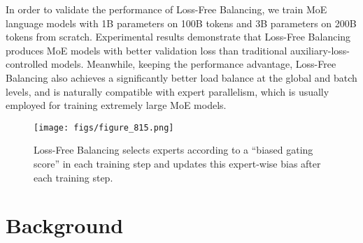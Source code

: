 \documentclass{article} %
\newcommand{\ours}{Loss-Free Balancing}
\newcommand{\Ours}{Loss-Free Balancing}
\begin{document}
In order to validate the performance of \ours{}, we train MoE language models with 1B parameters on 100B tokens and 3B parameters on 200B tokens from scratch. 
Experimental results demonstrate that \ours{} produces MoE models with better validation loss than traditional auxiliary-loss-controlled models. 
Meanwhile, keeping the performance advantage, \ours{} also achieves a significantly better load balance at the global and batch levels, and is naturally compatible with expert parallelism, which is usually employed for training extremely large MoE models. 

\begin{figure}[t]
  \centering
    \texttt{[image: figs/figure\_815.png]}
\caption{\Ours{} selects experts according to a ``biased gating score'' in each training step and updates this expert-wise bias after each training step.}
\label{fig:figure.pdf}
\end{figure}


\section{Background}
\end{document}
